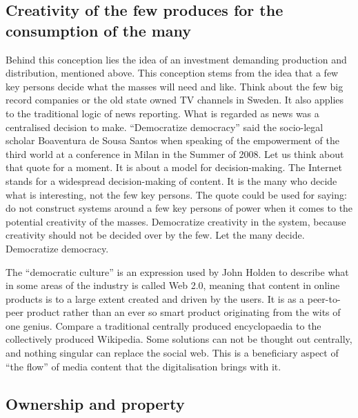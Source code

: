 \subsection{Creativity of the few produces for the consumption of the many}
\label{ss:darling_conceptions:darling_conceptions:creativity}

Behind this conception lies the idea of an investment demanding production and
distribution, mentioned above. This conception stems from the idea that a few
key persons decide what the masses will need and like. Think about the few big
record companies or the old state owned TV channels in Sweden. It also applies
to the traditional logic of news reporting. What is regarded as news was a
centralised decision to make. ``Democratize democracy'' said the socio-legal
scholar Boaventura de Sousa Santos when speaking of the empowerment of the third
world at a conference in Milan in the Summer of 2008. Let us think about that
quote for a moment. It is about a model for decision-making. The Internet stands
for a widespread decision-making of content. It is the many who decide what is
interesting, not the few key persons. The quote could be used for saying: do not
construct systems around a few key persons of power when it comes to the
potential creativity of the masses. Democratize creativity in the system,
because creativity should not be decided over by the few. Let the many decide.
Democratize democracy.

The ``democratic culture'' is an expression used by John
Holden\cite{darling-holden08} to describe what in some areas of the industry is
called Web 2.0, meaning that content in online products is to a large extent
created and driven by the users. It is as a peer-to-peer product rather than an
ever so smart product originating from the wits of one genius. Compare a
traditional centrally produced encyclopaedia to the collectively produced
Wikipedia. Some solutions can not be thought out centrally, and nothing singular
can replace the social web. This is a benef\hbox{}iciary aspect of ``the f\hbox{}low'' of
media content that the digitalisation brings with it. 


\subsection{Ownership and property}
\label{ss:darling_conceptions:darling_conceptions:ownership}

